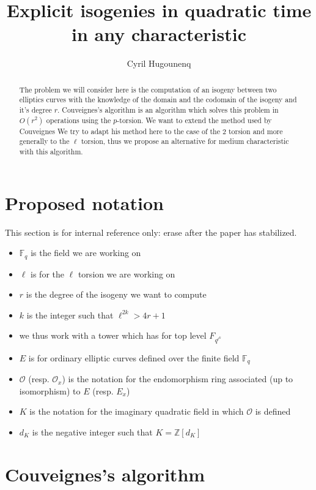 \documentclass{article}
\title{Explicit isogenies in quadratic time in any characteristic}
\author{Cyril Hugounenq}
\theoremstyle{plain}
\theoremstyle{definition}
\theoremstyle{remark}
\begin{document}
\begin{abstract}
The problem we will consider here is the computation of an isogeny between two elliptics curves with the knowledge of the domain and the codomain of the isogeny and it's degree $r$. Couveignes's algorithm is an algorithm which solves this problem in $O(r^2)$ operations using the $p$-torsion. We want to extend the method used by Couveignes  We try to adapt his method here to the case of the $2$ torsion and more generally to the $\ell$ torsion, thus we propose an alternative for medium characteristic with this algorithm.
\end{abstract}

\section*{Proposed notation}

This section is for internal reference only: erase after the paper has
stabilized.

\begin{itemize}
\item $\mathbb{F}_q$ is the field we are working on
\item $\ell$ is for the $\ell$ torsion we are working on
\item $r$ is the degree of the isogeny we want to compute
\item $k$ is the integer such that $\ell^{2k}>4r+1$
\item we thus work with a tower which has for top level $F_{q^{\ell^k}}$
\item $E$ is for ordinary elliptic curves defined over the finite field $\mathbb{F}_q$
\item $\mathcal{O}$ (resp. $\mathcal{O}_x$) is the notation for the endomorphism ring associated (up to isomorphism) to $E$ (resp. $E_x$)
\item $K$ is the notation for the imaginary quadratic field in which $\mathcal{O}$ is defined
\item $d_K$ is the negative integer such that $K=\mathbb{Z}[d_K]$  
\end{itemize}
\section{Couveignes's algorithm}
\end{document}
